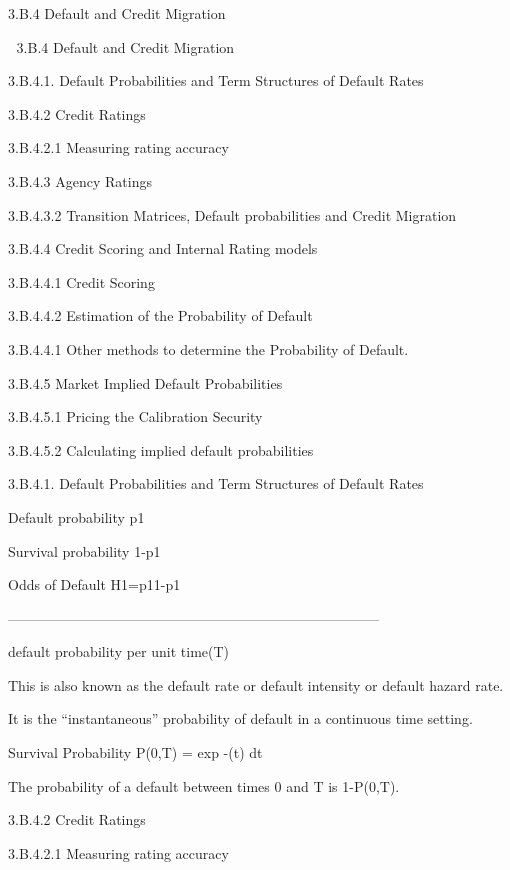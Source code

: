 
3.B.4 Default and Credit Migration



3.B.4 Default and Credit Migration

3.B.4.1. Default Probabilities and Term Structures of Default Rates

3.B.4.2 Credit Ratings

3.B.4.2.1  Measuring rating accuracy

3.B.4.3 Agency Ratings

3.B.4.3.2 Transition Matrices, Default probabilities and Credit Migration

3.B.4.4 Credit Scoring and Internal Rating models

3.B.4.4.1 Credit Scoring

3.B.4.4.2 Estimation of the Probability of Default

3.B.4.4.1 Other methods to determine the Probability of Default.

3.B.4.5 Market Implied Default Probabilities

3.B.4.5.1 Pricing the Calibration Security

3.B.4.5.2 Calculating implied default probabilities

 

3.B.4.1. Default Probabilities and Term Structures of Default Rates

Default probability p1

Survival probability  1-p1

Odds of Default H1={p1}{1-p1}



--------------------------------------------------------------------------------


default probability per unit time(T)

This is also known as the default rate or default intensity or default hazard rate.

It is the “instantaneous” probability of default in a continuous time setting.


Survival Probability P(0,T) = exp {-\int (t) dt }

The probability of a default between times 0 and T is 1-P(0,T).








3.B.4.2 Credit Ratings

3.B.4.2.1  Measuring rating accuracy

 


 

